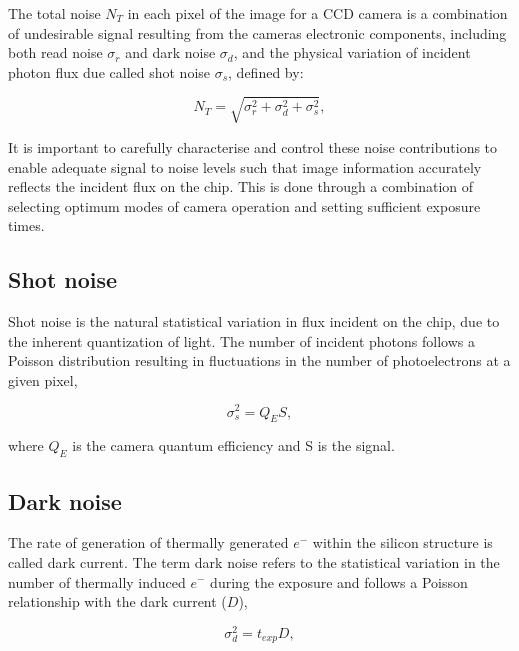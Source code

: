 \documentclass[twoside]{bhamthesis}
\theoremstyle{definition}
\begin{document}
\label{Appendix:Noise}
The total noise $N_T$ in each pixel of the image for a CCD camera is a combination of undesirable signal resulting from the cameras electronic components, including both read noise $\sigma_r$ and dark noise $\sigma_d$, and the physical variation of incident photon flux due called shot noise $\sigma_s$, defined by:

\begin{equation}
{ N_T= \sqrt{ \sigma_r^2 + \sigma_d^2 + \sigma_s^2}},
  \label{eqn:total_noise}
\end{equation}

It is important to carefully characterise and control these noise contributions to enable adequate signal to noise levels such that image information accurately reflects the incident flux on the chip. This is done through a combination of selecting optimum modes of camera operation and setting sufficient exposure times.

\subsection{Shot noise} 

Shot noise is the natural statistical variation in flux incident on the chip, due to the inherent quantization of light. The number of incident photons follows a Poisson distribution resulting in fluctuations in the number of photoelectrons at a given pixel,

\begin{equation}
{ \sigma_s^2 = Q_ES},
  \label{eqn:dark_noise}
\end{equation}

where $Q_E$ is the camera quantum efficiency and S is the signal.

\subsection{Dark noise} 
\label{Appendix:Dark_noise}

The rate of generation of thermally generated $e^-$ within the silicon structure is called dark current. The term dark noise refers to the statistical variation in the number of thermally induced $e^-$ during the exposure and follows a Poisson relationship with the dark current ($D$),

\begin{equation}
{ \sigma_d^2 = t_{exp}D},
  \label{eqn:dark_noise}
\end{equation}
\end{document}
